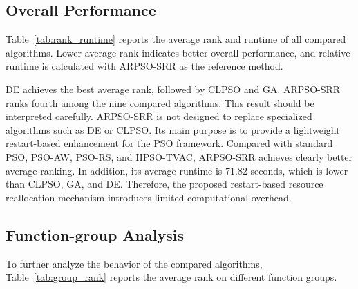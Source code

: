 \documentclass[conference]{IEEEtran}
\begin{document}
\subsection{Overall Performance}
Table~\ref{tab:rank_runtime} reports the average rank and runtime of all compared algorithms. Lower average rank indicates better overall performance, and relative runtime is calculated with ARPSO-SRR as the reference method.

\begin{table}[!t]
\caption{Average Rank and Runtime of Compared Algorithms}
\centering
\scriptsize
\setlength{\tabcolsep}{2pt}
\label{tab:rank_runtime}
\end{table}

DE achieves the best average rank, followed by CLPSO and GA. ARPSO-SRR ranks fourth among the nine compared algorithms. This result should be interpreted carefully. ARPSO-SRR is not designed to replace specialized algorithms such as DE or CLPSO. Its main purpose is to provide a lightweight restart-based enhancement for the PSO framework. Compared with standard PSO, PSO-AW, PSO-RS, and HPSO-TVAC, ARPSO-SRR achieves clearly better average ranking. In addition, its average runtime is 71.82 seconds, which is lower than CLPSO, GA, and DE. Therefore, the proposed restart-based resource reallocation mechanism introduces limited computational overhead.

\subsection{Function-group Analysis}
To further analyze the behavior of the compared algorithms, Table~\ref{tab:group_rank} reports the average rank on different function groups.
\end{document}
